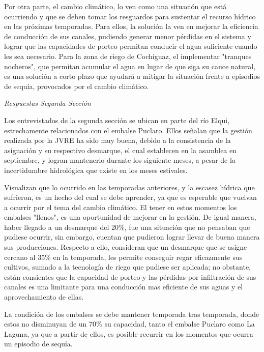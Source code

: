 \documentclass[11pt,]{article}
\begin{document}
Por otra parte, el cambio climático, lo ven como una situación que está ocurriendo y que se deben tomar los resguardos para sustentar el recurso hídrico en las próximas temporadas. Para ellos, la solución la ven en mejorar la eficiencia de conducción de sus canales, pudiendo generar menor pérdidas en el sistema y lograr que las capacidades de porteo permitan conducir el agua suficiente cuando les sea necesario. Para la zona de riego de Cochiguaz, el implementar "tranques nocheros", que permitan acumular el agua en lugar de que siga su cauce natural, es una solución a corto plazo que ayudará a mitigar la situación frente a episodios de sequía, provocados por el cambio climático. \bigskip

\bigskip
\textit {Respuestas Segunda Sección}\bigskip

 Los entrevistados de la segunda sección se ubican en parte del río Elqui, estrechamente relacionados con el embalse Puclaro. Ellos señalan que la gestión realizada por la JVRE ha sido muy buena, debido a la consistencia de la asignación y su respectivo desmarque, el cual establecen en la asamblea en septiembre, y logran mantenerlo durante los siguiente meses, a pesar de la incertidumbre hidrológica que existe en los meses estivales.\bigskip
 
 Visualizan que lo ocurrido en las temporadas anteriores, y la escasez hídrica que sufrieron,  es un hecho del cual se debe aprender, ya que es esperable que vuelvan a ocurrir por el tema del cambio climático. El tener en estos momentos los embalses "llenos", es una oportunidad de mejorar en la gestión. De igual manera, haber llegado a un desmarque del 20\%, fue una situación que no pensaban que pudiese ocurrir, sin embargo, cuentan que pudieron lograr llevar de buena manera sus producciones. Respecto a ello, consideran que un desmarque que se asigne cercano al 35\% en la temporada, les permite conseguir regar eficazmente sus cultivos, sumado a la tecnología de riego que pudiese ser aplicada; no obstante, están consientes que la capacidad de porteo y las pérdidas por infiltración de sus canales es una limitante para una conducción mas eficiente de sus aguas y el aprovechamiento de ellas. \bigskip
 
 La condición de los embalses se debe mantener temporada tras temporada, donde estos no disminuyan de un 70\% su capacidad, tanto el embalse Puclaro como La Laguna, ya que a partir de ellos, es posible recurrir en los momentos que ocurra un episodio de sequía. \bigskip
 
\end{document}
